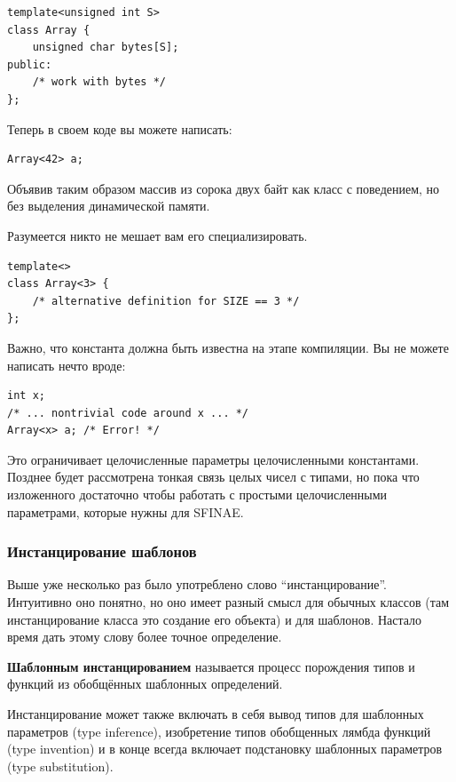 \documentclass[a4paper,12pt,oneside]{article}
\begin{document}
\begin{lstlisting}
template<unsigned int S>
class Array {
    unsigned char bytes[S];
public:
    /* work with bytes */
};
\end{lstlisting}

Теперь в своем коде вы можете написать:

\begin{lstlisting}
Array<42> a;
\end{lstlisting}

Объявив таким образом массив из сорока двух байт как класс с поведением, но без выделения динамической памяти.

Разумеется никто не мешает вам его специализировать.

\begin{lstlisting}
template<>
class Array<3> {
    /* alternative definition for SIZE == 3 */
};
\end{lstlisting}

Важно, что константа должна быть известна на этапе компиляции. Вы не можете написать нечто вроде:

\begin{lstlisting}
int x;
/* ... nontrivial code around x ... */
Array<x> a; /* Error! */
\end{lstlisting}

Это ограничивает целочисленные параметры целочисленными константами. Позднее будет рассмотрена тонкая связь целых чисел с типами, но пока что изложенного достаточно чтобы работать с простыми целочисленными параметрами, которые нужны для SFINAE.

\subsubsection{Инстанцирование шаблонов}\label{Templateinstancing}

Выше уже несколько раз было употреблено слово ``инстанцирование''. Интуитивно оно понятно, но оно имеет разный смысл для обычных классов (там инстанцирование класса это создание его объекта) и для шаблонов. Настало время дать этому слову более точное определение.

\textbf{Шаблонным инстанцированием} называется процесс порождения типов и функций из обобщённых шаблонных определений.

Инстанцирование может также включать в себя вывод типов для шаблонных параметров (type inference), изобретение типов обобщенных лямбда функций (type invention) и в конце всегда включает подстановку шаблонных параметров (type substitution).
\end{document}
